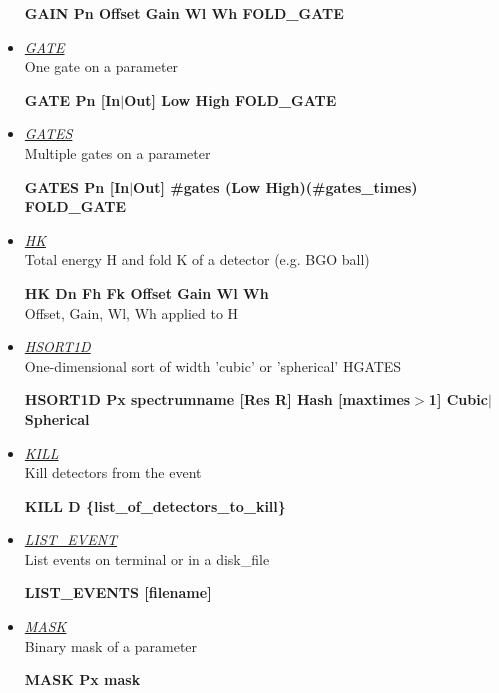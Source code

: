 \begin{itemize}
	\smallskip
	{\bf GAIN Pn Offset Gain Wl Wh FOLD\_GATE} \\

 \item	{\it\underline{GATE}} \\
	{\sc One gate on a parameter }

	\smallskip
	{\bf GATE Pn [In$|$Out] Low High FOLD\_GATE} \\

 \item	{\it\underline{GATES}} \\
	{\sc Multiple gates on a parameter }

	\smallskip
	{\bf GATES Pn [In$|$Out] \#gates (Low High)(\#gates\_times) FOLD\_GATE} \\

 \item	{\it\underline{HK}} \\
	{\sc Total energy H and fold K of a detector (e.g. BGO ball)}
	\smallskip

	{\bf HK Dn Fh Fk Offset Gain Wl Wh} \\
	\smallskip
	Offset, Gain, Wl, Wh applied to H \\

 \item	{\it\underline{HSORT1D}} \\
	{\sc One-dimensional sort of width 'cubic' or 'spherical' HGATES}

	\smallskip
	{\bf HSORT1D Px spectrumname [Res R] Hash [maxtimes$>$1]
	Cubic$|$Spherical} \\

 \item	{\it\underline{KILL}} \\
	{\sc Kill detectors from the event}

	\smallskip
	{\bf KILL D \{list\_of\_detectors\_to\_kill\}} \\

 \item	{\it\underline{LIST\_EVENT}} \\
	{\sc List events on terminal or in a disk\_file}

	\smallskip
	{\bf LIST\_EVENTS [filename]} \\

 \item	{\it\underline{MASK}} \\
	{\sc Binary mask of a parameter}

	\smallskip
	{\bf MASK Px mask} \\


\end{itemize}
